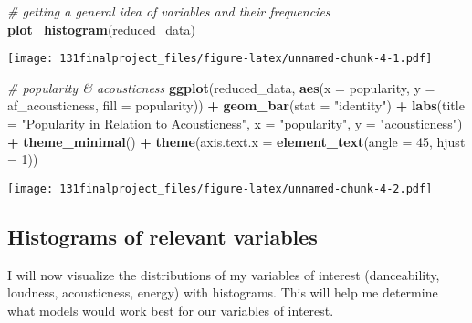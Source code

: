 \documentclass[
]{article}
\newenvironment{Shaded}{\begin{snugshade}}{\end{snugshade}}
\newcommand{\AttributeTok}[1]{\textcolor[rgb]{0.13,0.29,0.53}{#1}}
\newcommand{\CommentTok}[1]{\textcolor[rgb]{0.56,0.35,0.01}{\textit{#1}}}
\newcommand{\DecValTok}[1]{\textcolor[rgb]{0.00,0.00,0.81}{#1}}
\newcommand{\FunctionTok}[1]{\textcolor[rgb]{0.13,0.29,0.53}{\textbf{#1}}}
\newcommand{\NormalTok}[1]{#1}
\newcommand{\SpecialCharTok}[1]{\textcolor[rgb]{0.81,0.36,0.00}{\textbf{#1}}}
\newcommand{\StringTok}[1]{\textcolor[rgb]{0.31,0.60,0.02}{#1}}
\begin{document}
\begin{Shaded}
\begin{Highlighting}[]
\CommentTok{\# getting a general idea of variables and their frequencies}
\FunctionTok{plot\_histogram}\NormalTok{(reduced\_data)}
\end{Highlighting}
\end{Shaded}

\texttt{[image: 131finalproject\_files/figure-latex/unnamed-chunk-4-1.pdf]}

\begin{Shaded}
\begin{Highlighting}[]
\CommentTok{\# popularity \& acousticness}
\FunctionTok{ggplot}\NormalTok{(reduced\_data, }\FunctionTok{aes}\NormalTok{(}\AttributeTok{x =}\NormalTok{ popularity, }\AttributeTok{y =}\NormalTok{ af\_acousticness, }\AttributeTok{fill =}\NormalTok{ popularity)) }\SpecialCharTok{+}
  \FunctionTok{geom\_bar}\NormalTok{(}\AttributeTok{stat =} \StringTok{"identity"}\NormalTok{) }\SpecialCharTok{+}
  \FunctionTok{labs}\NormalTok{(}\AttributeTok{title =} \StringTok{"Popularity in Relation to Acousticness"}\NormalTok{, }\AttributeTok{x =} \StringTok{"popularity"}\NormalTok{, }\AttributeTok{y =} \StringTok{"acousticness"}\NormalTok{) }\SpecialCharTok{+}
  \FunctionTok{theme\_minimal}\NormalTok{() }\SpecialCharTok{+}
  \FunctionTok{theme}\NormalTok{(}\AttributeTok{axis.text.x =} \FunctionTok{element\_text}\NormalTok{(}\AttributeTok{angle =} \DecValTok{45}\NormalTok{, }\AttributeTok{hjust =} \DecValTok{1}\NormalTok{))}
\end{Highlighting}
\end{Shaded}

\texttt{[image: 131finalproject\_files/figure-latex/unnamed-chunk-4-2.pdf]}

\hypertarget{histograms-of-relevant-variables}{%
\subsection{\texorpdfstring{\textbf{Histograms of relevant
variables}}{Histograms of relevant variables}}\label{histograms-of-relevant-variables}}

I will now visualize the distributions of my variables of interest
(danceability, loudness, acousticness, energy) with histograms. This
will help me determine what models would work best for our variables of
interest.

\begin{Shaded}
\end{Shaded}
\end{document}
